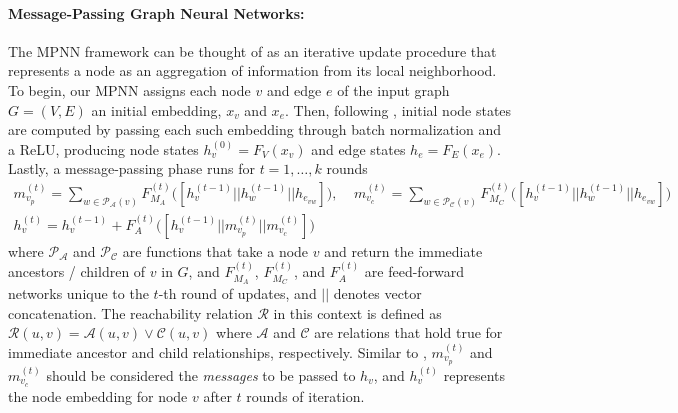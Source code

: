 \documentclass{article}
\begin{document}
\paragraph{Message-Passing Graph Neural Networks:} The MPNN framework can be thought of as an iterative update procedure that represents a node as an aggregation of information from its local neighborhood. 
To begin, our MPNN assigns each node $v$ and edge $e$ of the input graph $G = (V, E)$ an initial embedding, $x_v$ and $x_e$. Then, following \cite{wang2017premise}, initial node states are computed by passing each such embedding through batch normalization \cite{ioffe2015batch} and a ReLU, producing node states $h_v^{(0)} = F_{V}(x_v)$ and edge states $h_e = F_{E}(x_e)$. Lastly, a message-passing phase runs for $t = 1, \ldots, k$ rounds\begin{equation*}
\begin{gathered}
m_{v_p}^{(t)} = \sum_{w \in \mathcal{P}_{\mathcal{A}}(v)} F^{(t)}_{M_A}\big([h_v^{(t - 1)} || h_w^{(t - 1)} || h_{e_{vw}}]\big), \ \ \ \ \ 
m_{v_c}^{(t)} = \sum_{w \in \mathcal{P}_{\mathcal{C}}(v)} F^{(t)}_{M_C}\big([h_v^{(t - 1)} || h_w^{(t - 1)} || h_{e_{vw}}]\big) \\
h_v^{(t)} = h^{(t - 1)}_v + F^{(t)}_{A}\big([h_v^{(t - 1)} || m_{v_p}^{(t)} || m_{v_c}^{(t)} ]\big)
\end{gathered}
\end{equation*}
where $\mathcal{P}_{\mathcal{A}}$ and $\mathcal{P}_{\mathcal{C}}$ are functions that take a node $v$ and return the immediate ancestors / children of $v$ in $G$, and $F^{(t)}_{M_A}$, $F^{(t)}_{M_C}$, and $F^{(t)}_{A}$ are feed-forward networks unique to the $t$-th round of updates, and $||$ denotes vector concatenation. The reachability relation $\mathcal{R}$ in this context is defined as $\mathcal{R}(u, v) = \mathcal{A}(u, v) \vee \mathcal{C}(u, v)$ where $\mathcal{A}$ and $\mathcal{C}$ are relations that hold true for immediate ancestor and child relationships, respectively.
Similar to \cite{gilmer2017neural}, $m_{v_p}^{(t)}$ and $m_{v_c}^{(t)}$ should be considered the \textit{messages} to be passed to $h_v$, and $h_v^{(t)}$ represents the node embedding for node $v$ after $t$ rounds of iteration.
\end{document}

